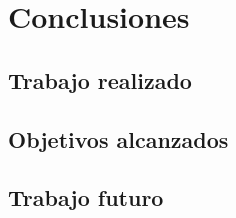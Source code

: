 \chapter{Conclusiones}
\section{Trabajo realizado}
\section{Objetivos alcanzados}
\section{Trabajo futuro}
